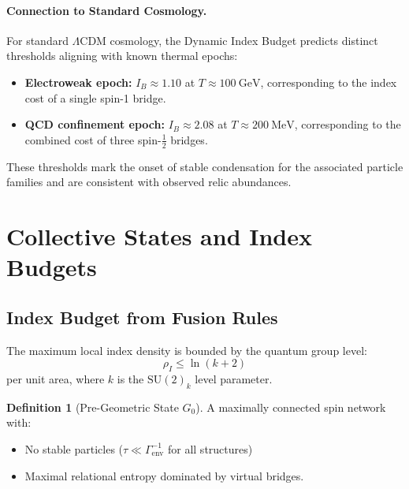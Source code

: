 \documentclass[11pt]{article}
\theoremstyle{plain}
\theoremstyle{definition}
\newtheorem{definition}[theorem]{Definition}
\begin{document}
\paragraph{Connection to Standard Cosmology.}
For standard $\Lambda$CDM cosmology, the Dynamic Index Budget predicts distinct
thresholds aligning with known thermal epochs:
\begin{itemize}[leftmargin=*]
  \item \textbf{Electroweak epoch:} $I_B \approx 1.10$ at $T \approx 100~\mathrm{GeV}$,
    corresponding to the index cost of a single spin-1 bridge.
  \item \textbf{QCD confinement epoch:} $I_B \approx 2.08$ at $T \approx 200~\mathrm{MeV}$,
    corresponding to the combined cost of three spin-$\tfrac12$ bridges.
\end{itemize}
These thresholds mark the onset of stable condensation for the associated
particle families and are consistent with observed relic abundances.

\section{Collective States and Index Budgets}
\subsection{Index Budget from Fusion Rules}
The maximum local index density is bounded by the quantum group level:
\begin{equation}
  \rho_I \leq \ln(k+2)
\end{equation}
per unit area, where $k$ is the $\mathrm{SU}(2)_k$ level parameter.
\begin{definition}[Pre-Geometric State $G_0$]
  A maximally connected spin network with:
  \begin{itemize}
    \item No stable particles ($\tau \ll \Gamma_{\mathrm{env}}^{-1}$ for all structures)
    \item Maximal relational entropy dominated by virtual bridges.
  \end{itemize}
\end{definition}
\end{document}
